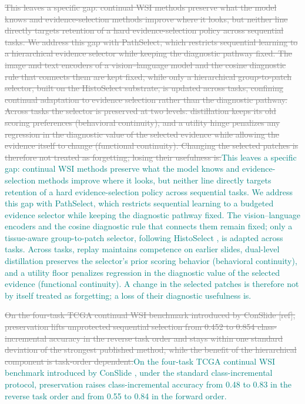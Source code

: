 \documentclass{article}
\newif\ifmarkup \markuptrue
\newcommand{\repc}[3]{\ifmarkup\textcolor{gray}{\sout{#2}}\textcolor{#1}{#3}\else#3\fi}
\newcommand{\repG}[2]{\repc{teal}{#1}{#2}}    %
\begin{document}
\repG{This leaves a specific gap: continual WSI methods preserve what the model knows and evidence-selection methods improve where it looks, but neither line directly targets retention of a hard evidence-selection policy across sequential tasks. We address this gap with PathSelect, which restricts sequential learning to a hierarchical evidence selector while keeping the diagnostic pathway fixed. The image and text encoders of a vision--language model and the cosine diagnostic rule that connects them are kept fixed, while only a hierarchical group-to-patch selector, built on the HistoSelect substrate, is updated across tasks, confining continual adaptation to evidence selection rather than the diagnostic pathway. Across tasks the selector is preserved at two levels: distillation keeps its old scoring preferences (behavioral continuity), and a utility hinge penalizes any regression in the diagnostic value of the selected evidence while allowing the evidence itself to change (functional continuity). Changing the selected patches is therefore not treated as forgetting; losing their usefulness is.}{This leaves a specific gap: continual WSI methods preserve what the model knows and evidence-selection methods improve where it looks, but neither line directly targets retention of a hard evidence-selection policy across sequential tasks. We address this gap with PathSelect, which restricts sequential learning to a budgeted evidence selector while keeping the diagnostic pathway fixed. The vision--language encoders and the cosine diagnostic rule that connects them remain fixed; only a tissue-aware group-to-patch selector, following HistoSelect \cite{huang2026histoselect}, is adapted across tasks. Across tasks, replay maintains competence on earlier slides, dual-level distillation preserves the selector's prior scoring behavior (behavioral continuity), and a utility floor penalizes regression in the diagnostic value of the selected evidence (functional continuity). A change in the selected patches is therefore not by itself treated as forgetting; a loss of their diagnostic usefulness is.}

\repG{On the four-task TCGA continual WSI benchmark introduced by ConSlide [ref], preservation lifts unprotected sequential selection from 0.452 to 0.854 class-incremental accuracy in the reverse task order and stays within one standard deviation of the strongest published method, while the benefit of the hierarchical component is task-order dependent.}{On the four-task TCGA continual WSI benchmark introduced by ConSlide \cite{huang2023conslide}, under the standard class-incremental protocol, preservation raises class-incremental accuracy from 0.48 to 0.83 in the reverse task order and from 0.55 to 0.84 in the forward order.}
\end{document}
